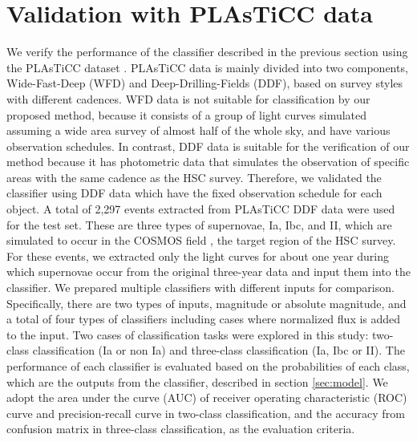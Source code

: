 \documentclass[useamsfonts]{pasj01}
\begin{document}
\section{Validation with PLAsTiCC data} %
%
We verify the performance of the classifier described in the previous section using the PLAsTiCC dataset \citep{plasticc_dataset}.
PLAsTiCC data is mainly divided into two components, Wide-Fast-Deep (WFD) and Deep-Drilling-Fields (DDF), based on survey styles with different cadences.
WFD data is not suitable for classification by our proposed method, because it consists of a group of light curves simulated assuming a wide area survey of almost half of the whole sky, and have various observation schedules.
In contrast, DDF data is suitable for the verification of our method because it has photometric data that simulates the observation of specific areas with the same cadence as the HSC survey.
Therefore, we validated the classifier using DDF data which have the fixed observation schedule for each object.
A total of 2,297 events extracted from PLAsTiCC DDF data were used for the test set.
These are three types of supernovae, Ia, Ibc, and II, which are simulated to occur in the COSMOS field \citep{scoville2007cosmos}, the target region of the HSC survey.
For these events, we extracted only the light curves for about one year during which supernovae occur from the original three-year data and input them into the classifier.
%
We prepared multiple classifiers with different inputs for comparison.
Specifically, there are two types of inputs, magnitude or absolute magnitude, and a total of four types of classifiers including cases where normalized flux is added to the input. 
Two cases of classification tasks were explored in this study: two-class classification (Ia or non Ia) and three-class classification (Ia, Ibc or II).
The performance of each classifier is evaluated based on the probabilities of each class, which are the outputs from the classifier, described in section \ref{sec:model}.
We adopt the area under the curve (AUC) of receiver operating characteristic (ROC) curve and precision-recall curve in two-class classification, and the accuracy from confusion matrix in three-class classification, as the evaluation criteria.
%
\end{document}
